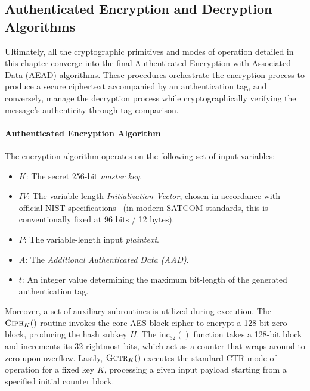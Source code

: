 \documentclass[11pt,a4paper]{report}
\begin{document}
\subsection{Authenticated Encryption and Decryption Algorithms}
Ultimately, all the cryptographic primitives and modes of operation detailed in this chapter converge into the final Authenticated Encryption with Associated Data (AEAD) algorithms. 
These procedures orchestrate the encryption process to produce a secure ciphertext accompanied by an authentication tag, and conversely, manage the decryption process while cryptographically verifying the message's authenticity through tag comparison.

\paragraph{Authenticated Encryption Algorithm}
The encryption algorithm operates on the following set of input variables:
\begin{itemize}
    \item $K$: The secret 256-bit \textit{master key}.
    \item $IV$: The variable-length \textit{Initialization Vector}, chosen in accordance with official NIST specifications~\cite[p. 18--21]{GCM} (in modern SATCOM standards, this is conventionally fixed at 96 bits / 12 bytes).
    \item $P$: The variable-length input \textit{plaintext}.
    \item $A$: The \textit{Additional Authenticated Data (AAD)}.
    \item $t$: An integer value determining the maximum bit-length of the generated authentication tag.
\end{itemize}

Moreover, a set of auxiliary subroutines is utilized during execution. 
The $\textsc{Ciph}_K()$ routine invokes the core AES block cipher to encrypt a 128-bit zero-block, producing the hash subkey $H$. 
The $\text{inc}_{32}()$ function takes a 128-bit block and increments its 32 rightmost bits, which act as a counter that wraps around to zero upon overflow. 
Lastly, $\textsc{Gctr}_K()$ executes the standard CTR mode of operation for a fixed key $K$, processing a given input payload starting from a specified initial counter block.
\end{document}
